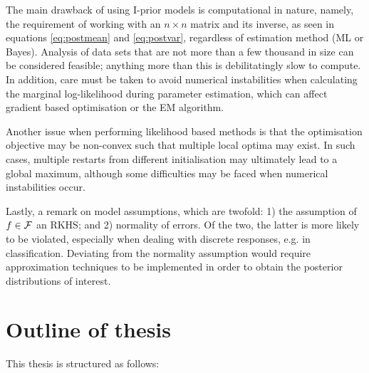 \documentclass[a4paper,showframe,11pt]{report}
\begin{document}
The main drawback of using I-prior models is computational in nature, namely, the requirement of working with an $n \times n$ matrix and its inverse, as seen in equations \cref{eq:postmean} and \cref{eq:postvar}, regardless of estimation method (ML or Bayes).
Analysis of data sets that are not more than a few thousand in size can be considered feasible; anything more than this is debilitatingly slow to compute.
In addition, care must be taken to avoid numerical instabilities when calculating the marginal log-likelihood during parameter estimation, which can affect gradient based optimisation or the EM algorithm.

Another issue when performing likelihood based methods is that the optimisation objective may be non-convex such that multiple local optima may exist. 
In such cases, multiple restarts from different initialisation may ultimately lead to a global maximum, although some difficulties may be faced when numerical instabilities occur.

Lastly, a remark on model assumptions, which are twofold: 1) the assumption of $f \in {\mathcal F}$ an RKHS; and 2) normality of errors.
Of the two, the latter is more likely to be violated, especially when dealing with discrete responses, e.g. in classification.
Deviating from the normality assumption would require approximation techniques to be implemented in order to obtain the posterior distributions of interest.

\section{Outline of thesis}

This thesis is structured as follows:
\end{document}
